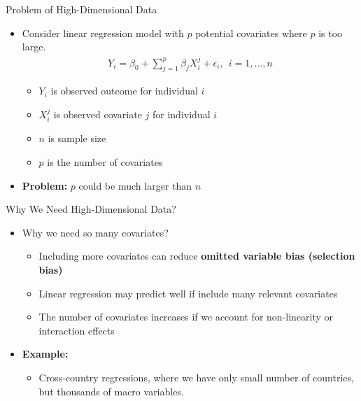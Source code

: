\documentclass[dvipsnames,hyperref={pdfpagelabels=false}]{beamer}
\begin{document}
	

	
	
	
	\begin{frame}{Problem of High-Dimensional Data}
		\begin{itemize}
			\item Consider linear regression model with $p$ potential covariates where $p$ is too large.
			\vspace{0.2cm}
			\begin{eqnarray*}
				Y_{i} = \beta_{0} + \sum^{p}_{j=1} \beta_{j} X^{j}_{i}  + \epsilon_{i}, 
			 \ \ i=1, \ldots ,n
			\end{eqnarray*}
			
			\begin{itemize}
				\item $Y_{i}$ is observed outcome for individual $i$ 
				\vspace{0.2cm}
				\item $X^{j}_{i}$ is observed covariate $j$ for individual $i$ 
				\vspace{0.2cm}
				\item $n$ is sample size
				\vspace{0.2cm}
				\item $p$ is the number of covariates
				\vspace{0.2cm}
			\end{itemize}
			\item \textbf{Problem:} $p$ could be much larger than $n$
		\end{itemize}
	\end{frame}
	
	
	
	
	\begin{frame}{Why We Need High-Dimensional Data?}
		\begin{itemize}
			\item Why we need so many covariates? 
			\vspace{0.2cm}
			\begin{itemize}
				\item Including more covariates can reduce \textbf{omitted variable bias (selection bias)}	
				\vspace{0.2cm}
				\item Linear regression may predict well if include many relevant covariates
					\vspace{0.2cm}
				\item The number of covariates increases if we account for non-linearity or interaction effects
			\end{itemize}
		\item \textbf{Example:} 
							\vspace{0.2cm}
					\begin{itemize}
		\item Cross-country regressions, where we have only small number of
		countries, but thousands of macro variables.	
					\end{itemize}
		\end{itemize}
	\end{frame}
	
\end{document}
